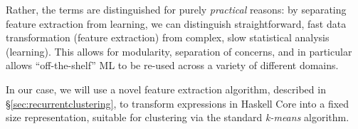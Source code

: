 Rather, the terms are distinguished for purely \emph{practical} reasons: by separating feature extraction from learning, we can distinguish straightforward, fast data transformation (feature extraction) from complex, slow statistical analysis (learning). This allows for modularity, separation of concerns, and in particular allows ``off-the-shelf'' ML to be re-used across a variety of different domains.

In our case, we will use a novel feature extraction algorithm, described in \S \ref{sec:recurrentclustering}, to transform expressions in Haskell Core into a fixed size representation, suitable for clustering via the standard \emph{k-means} algorithm.

\iffalse TODO: I have had a look now at section 5. I do not think feature extraction and clustering is explained/defined there, either. Seeing your contribution is feature extraction algorithms, you need to define feature vectors and clusters *here* \fi

\begin{figure}
  \centering

  \caption{}

  \label{fig:featureextractionpic}
\end{figure}

\iffalse
\subsection{Clustering}
\fi
